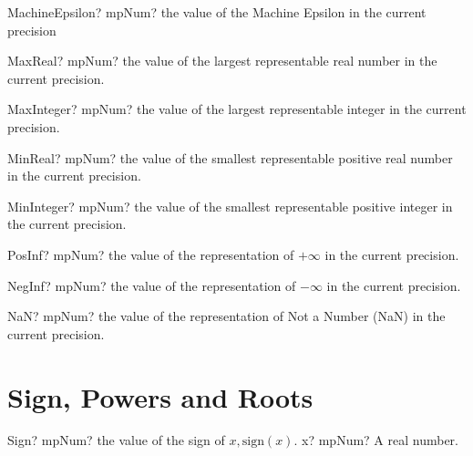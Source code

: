 \documentclass[12pt,a4paper,openany]{book}
\begin{document}
\begin{mpFunctionsExtract}
\mpFunctionZero
{MachineEpsilon? mpNum? the value of the Machine Epsilon in the current precision}
\end{mpFunctionsExtract}

\begin{mpFunctionsExtract}
\mpFunctionZero
{MaxReal? mpNum? the value of the largest representable real number in the current precision.}
\end{mpFunctionsExtract}

\begin{mpFunctionsExtract}
\mpFunctionZero
{MaxInteger? mpNum? the value of the largest representable integer in the current precision.}
\end{mpFunctionsExtract}

\begin{mpFunctionsExtract}
\mpFunctionZero
{MinReal? mpNum? the value of the smallest representable positive real number in the current precision.}
\end{mpFunctionsExtract}

\begin{mpFunctionsExtract}
\mpFunctionZero
{MinInteger? mpNum? the value of the smallest representable positive integer in the current precision.}
\end{mpFunctionsExtract}

\begin{mpFunctionsExtract}
\mpFunctionZero
{PosInf? mpNum? the value of the representation of  $+\infty$ in the current precision.}
\end{mpFunctionsExtract}

\begin{mpFunctionsExtract}
\mpFunctionZero
{NegInf? mpNum? the value of the representation of  $-\infty$ in the current precision.}
\end{mpFunctionsExtract}

\begin{mpFunctionsExtract}
\mpFunctionZero
{NaN? mpNum? the value of the representation of Not a Number (NaN) in the current precision.}
\end{mpFunctionsExtract}

\section{Sign, Powers and Roots}

\begin{mpFunctionsExtract}
\mpFunctionOne
{Sign? mpNum? the value of the sign of $x, \text{sign}(x)$.}
{x? mpNum? A real number.}
\end{mpFunctionsExtract}
\end{document}
